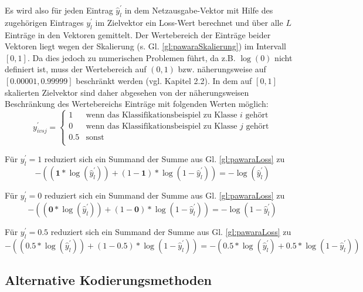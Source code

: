 Es wird also für jeden Eintrag $\widehat{y}_{l}^{'}$ in dem Netzausgabe-Vektor mit Hilfe des zugehörigen Eintrages $y_{l}^{'}$ im Zielvektor ein Loss-Wert berechnet und über alle $L$ Einträge in den Vektoren gemittelt. Der Wertebereich der Einträge beider Vektoren liegt wegen der Skalierung (s. Gl. \ref{gl:pawaraSkalierung}) im Intervall $[0,1]$. Da dies jedoch zu numerischen Problemen führt, da z.B. $\log{(0)}$ nicht definiert ist, muss der Wertebereich auf $(0, 1)$ bzw. näherungsweise auf $[0.00001, 0.99999]$ beschränkt werden (vgl. \cite{pawaraPaper} Kapitel 2.2).
In dem auf $[0, 1]$ skalierten Zielvektor sind daher abgesehen von der näherungsweisen Beschränkung des Wertebereichs Einträge mit folgenden Werten möglich:
\[
y_{ivsj}^{'}=
\begin{cases}
1 & \text{wenn das Klassifikationsbeispiel zu Klasse } i \text{ gehört}\\
0 & \text{wenn das Klassifikationsbeispiel zu Klasse } j \text{ gehört}\\
0.5 & \text{sonst}\\
\end{cases}
\]

Für $y_{l}^{'} = 1$ reduziert sich ein Summand der Summe aus Gl. \ref{gl:pawaraLoss} zu
\[-((\boldsymbol{1} * \log{(\widehat{y}_{l}^{'})}) + (1 - \boldsymbol{1}) * \log{(1-\widehat{y}_{l}^{'})}) = -\log{(\widehat{y}_{l}^{'})}\]

Für $y_{l}^{'} = 0$ reduziert sich ein Summand der Summe aus Gl. \ref{gl:pawaraLoss} zu
\[-((\boldsymbol{0} * \log{(\widehat{y}_{l}^{'})}) + (1 - \boldsymbol{0}) * \log{(1-\widehat{y}_{l}^{'})}) = -\log{(1-\widehat{y}_{l}^{'})}\]

Für $y_{l}^{'} = 0.5$ reduziert sich ein Summand der Summe aus Gl. \ref{gl:pawaraLoss} zu
\[-((\boldsymbol{0.5} * \log{(\widehat{y}_{l}^{'})}) + (1 - \boldsymbol{0.5}) * \log{(1-\widehat{y}_{l}^{'})}) = - (0.5 * \log{(\widehat{y}_{l}^{'})} + 0.5 * \log{(1-\widehat{y}_{l}^{'})})\]


\subsection{Alternative Kodierungsmethoden}

